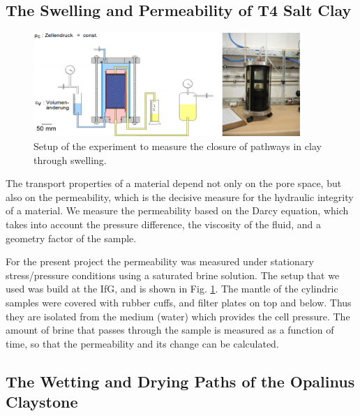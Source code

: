 \subsection{The Swelling and Permeability of T4 Salt Clay}
\label{sec:t4swell}

\begin{figure}[ht]
\centering
\includegraphics[width=0.9\textwidth]{figures/IfG-T4-Perm-aufbau.png}
\caption{Setup of the experiment to measure the closure of pathways in clay through
swelling.}
\label{fig:t4swellsetup}
\end{figure}

The transport properties of a material depend not only on the pore space, but also on the permeability, which is the decisive measure for the hydraulic integrity of a material. We measure the permeability based on the Darcy equation, which takes into account the pressure difference, the viscosity of the fluid, and a geometry factor of the sample. 

For the present project the permeability was measured under stationary stress/pressure conditions using a saturated brine solution. The setup that we used was build at the IfG, and is shown in Fig. \ref{fig:t4swellsetup}. The mantle of the cylindric samples were covered with rubber cuffs, and filter plates on top and below. Thus they are isolated from the medium (water) which provides the cell pressure. The amount of brine that passes through the sample is measured as a function of time, so that the permeability and its change can be calculated. 


\subsection{The Wetting and Drying Paths of the Opalinus Claystone}
\label{sec:Shrinkage_Swelling_Exp}

